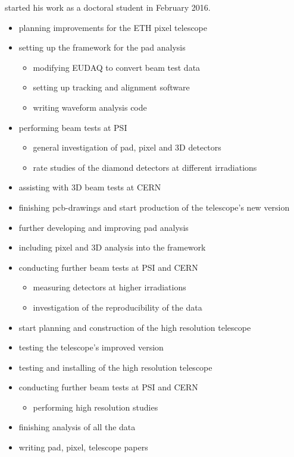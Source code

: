 \me started his work as a doctoral student in February 2016.\parsmall

\begin{itemize}
  \item planning improvements for the ETH pixel telescope %
  \item setting up the framework for the pad analysis %
  \begin{itemize}
		\item modifying EUDAQ to convert beam test data %
		\item setting up tracking and alignment software
		\item writing waveform analysis code
  \end{itemize}
  \item performing beam tests at \ac{PSI}
  \begin{itemize}
    \item general investigation of pad, pixel and 3D detectors
    \item rate studies of the diamond detectors at different irradiations
  \end{itemize}
  \item assisting with 3D beam tests at CERN
\end{itemize}

\begin{itemize}
  \item finishing pcb-drawings and start production of the telescope's new version
  \item further developing and improving pad analysis
  \item including pixel and 3D analysis into the framework
  \item conducting further beam tests at \ac{PSI} and CERN
  \begin{itemize}
		\item measuring detectors at higher irradiations
		\item investigation of the reproducibility of the data
  \end{itemize}
  \item start planning and construction of the high resolution telescope
\end{itemize}

\begin{itemize}
  \item testing the telescope's improved version
  \item testing and installing of the high resolution telescope
  \item conducting further beam tests at \ac{PSI} and CERN
  \begin{itemize}
		\item performing high resolution studies
  \end{itemize}
  \item finishing analysis of all the data
  \item writing pad, pixel, telescope papers
\end{itemize}
\parend